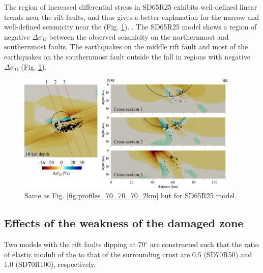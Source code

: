 \documentclass[draft]{agujournal2018}
\begin{document}
The region of increased differential stress in SD65R25 exhibits well-defined linear trends near the rift faults, and thus gives a better explanation for the narrow and well-defined seismicity near the  (Fig. \ref{fig:profiles_65_40_40_2km}). . The SD65R25 model shows a region of negative $\Delta\sigma_{D}^{\prime}$ between the observed seismicity on the northernmost and southernmost faults. The earthquakes on the middle rift fault and most of the earthquakes on the southernmost fault outside the  fall in regions with negative $\Delta\sigma_{D}^{\prime}$ (Fig. \ref{fig:profiles_65_40_40_2km}).


\begin{figure}[ht]
\centering
\includegraphics[width=25pc]{Figures/SD65R25_profiles.png}
\caption{Same as Fig. \ref{fig:profiles_70_70_70_2km} but for SD65R25 model.}
\label{fig:profiles_65_40_40_2km}
\end{figure}

\subsection{Effects of the weakness of the damaged  zone}
Two models with the rift faults dipping at 70$^{\circ}$ are constructed such that the ratio of elastic moduli of the  to that of the surrounding crust are 0.5 (SD70R50) and 1.0 (SD70R100), respectively.
\end{document}
